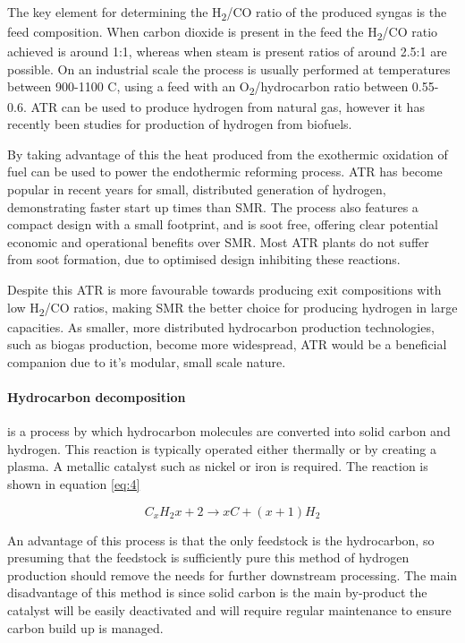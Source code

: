The key element for determining the H\textsubscript{2}/CO ratio of the produced syngas is the feed composition. When carbon dioxide is present in the feed the H\textsubscript{2}/CO ratio achieved is around 1:1, whereas when steam is present ratios of around 2.5:1 are possible. On an industrial scale the process is usually performed at temperatures between 900-1100 \textdegree C, using a feed with an O\textsubscript{2}/hydrocarbon ratio between 0.55-0.6.\cite{CHIESA2010383} ATR can be used to produce hydrogen from natural gas, however it has recently been studies for production of hydrogen from biofuels. \cite{FRUSTERI2015109}

By taking advantage of this the heat produced from the exothermic oxidation of fuel can be used to power the endothermic reforming process. ATR has become popular in recent years for small, distributed generation of hydrogen, demonstrating faster start up times than SMR. The process also features a compact design with a small footprint, and is soot free, offering clear potential economic and operational benefits over SMR. \cite{SUI2016461} Most ATR plants do not suffer from soot formation, due to optimised design inhibiting these reactions.\cite{SUI2016461}

Despite this ATR is more favourable towards producing exit compositions with low H\textsubscript{2}/CO ratios, making SMR the better choice for producing hydrogen in large capacities. \cite{SUI2016461} As smaller, more distributed hydrocarbon production technologies, such as biogas production, become more widespread, ATR would be a beneficial companion due to it's modular, small scale nature.

\paragraph{Hydrocarbon decomposition} is a process by which hydrocarbon molecules are converted into solid carbon and hydrogen. \cite{Ahmed2009} This reaction is typically operated either thermally or by creating a plasma. A metallic catalyst such as nickel or iron is required. The reaction is shown in equation \ref{eq:4} \cite{Muradov2008} 

\begin{equation}\label{eq:4}
    C_x H_2x+2 \rightarrow xC + (x+1)H_2
\end{equation}

An advantage of this process is that the only feedstock is the hydrocarbon, so presuming that the feedstock is sufficiently pure this method of hydrogen production should remove the needs for further downstream processing. \cite{Ahmed2009} The main disadvantage of this method is since solid carbon is the main by-product the catalyst will be easily deactivated and will require regular maintenance to ensure carbon build up is managed. \cite{Ahmed2009}


